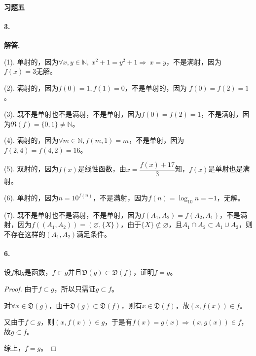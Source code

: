 \documentclass[12pt, a4paper, oneside]{ctexart}
\newenvironment{solution}{\par\noindent\textbf{解答. }}{\bigskip\par}
\begin{document}
\paragraph{习题五}
\paragraph{3.}\begin{solution}

    (1). 单射的，因为$\forall x, y\in \mathbb{N},\ x^2+1=y^2+1\Rightarrow\ x = y$，不是满射，因为$f(x) = 3$无解。

    (2). 满射的，因为$f(0) = 1, f(1) = 0$，不是单射的，因为 $f(0) = f(2) = 1$。

    (3). 既不是单射也不是满射，不是单射，因为$f(0)=f(2)=1$，不是满射，因为$\mathfrak{R}(f) = \{0, 1\} \neq \mathbb{N}$。

    (4). 满射的，因为$\forall m\in \mathbb{N}, f(m, 1) = m$，不是单射，因为$f(2,4)=f(4,2)=16$。

    (5). 双射的，因为$f(x)$是线性函数，由$x = \dfrac{f(x)+17}{3}$知，$f(x)$是单射也是满射。

    (6). 单射的，因为$n = 10^{f(n)}$，不是满射，因为$f(n) = \log_{10}n = -1$，无解。

    (7). 既不是单射也不是满射，不是单射，因为$f(A_1, A_2) = f(A_2, A_1)$，不是满射，因为$f((A_1, A_2)) = (\varnothing, \{X\})$，由于$\{X\}\not\subset \varnothing$，且$A_1\cap A_2\subset A_1\cup A_2$，则不存在这样的$(A_1, A_2)$满足条件。
\end{solution}

\paragraph{6.}设$f$和$g$是函数，$f\subset g$并且$\mathfrak{D}(g)\subset\mathfrak{D}(f)$，证明$f=g$。
\begin{proof}
    由于$f\subset g$，所以只需证$g\subset f$。
    
    对$\forall x\in\mathfrak{D}(g)$，由于$\mathfrak{D}(g)\subset\mathfrak{D}(f)$，则有$x\in\mathfrak{D}(f)$，故$(x,f(x))\in f$。
    
    又由于$f\subset g$，则$(x,f(x))\in g$，于是有$f(x) = g(x)\Rightarrow (x, g(x)) \in f$，故$g\subset f$。

    综上，$f = g$。
\end{proof}
\end{document}

